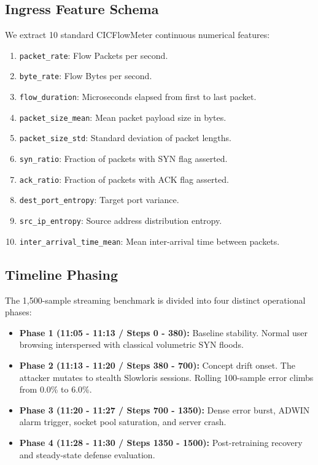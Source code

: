 \documentclass[conference]{IEEEtran}
\begin{document}
\subsection{Ingress Feature Schema}
We extract 10 standard CICFlowMeter continuous numerical features:
\begin{enumerate}
    \item \texttt{packet\_rate}: Flow Packets per second.
    \item \texttt{byte\_rate}: Flow Bytes per second.
    \item \texttt{flow\_duration}: Microseconds elapsed from first to last packet.
    \item \texttt{packet\_size\_mean}: Mean packet payload size in bytes.
    \item \texttt{packet\_size\_std}: Standard deviation of packet lengths.
    \item \texttt{syn\_ratio}: Fraction of packets with SYN flag asserted.
    \item \texttt{ack\_ratio}: Fraction of packets with ACK flag asserted.
    \item \texttt{dest\_port\_entropy}: Target port variance.
    \item \texttt{src\_ip_entropy}: Source address distribution entropy.
    \item \texttt{inter\_arrival\_time\_mean}: Mean inter-arrival time between packets.
\end{enumerate}

\subsection{Timeline Phasing}
The 1,500-sample streaming benchmark is divided into four distinct operational phases:
\begin{itemize}
    \item \textbf{Phase 1 (11:05 - 11:13 / Steps 0 - 380):} Baseline stability. Normal user browsing interspersed with classical volumetric SYN floods.
    \item \textbf{Phase 2 (11:13 - 11:20 / Steps 380 - 700):} Concept drift onset. The attacker mutates to stealth Slowloris sessions. Rolling 100-sample error climbs from 0.0\% to 6.0\%.
    \item \textbf{Phase 3 (11:20 - 11:27 / Steps 700 - 1350):} Dense error burst, ADWIN alarm trigger, socket pool saturation, and server crash.
    \item \textbf{Phase 4 (11:28 - 11:30 / Steps 1350 - 1500):} Post-retraining recovery and steady-state defense evaluation.
\end{itemize}
\end{document}
